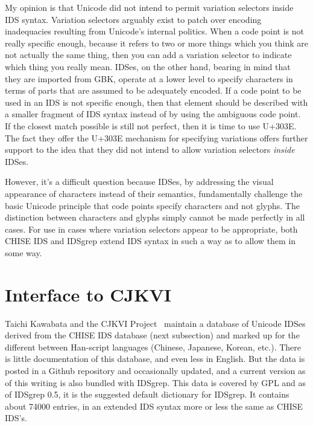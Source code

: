 \documentclass[twocolumn]{report}
\begin{document}
My opinion is that Unicode did not intend to permit variation selectors
inside IDS syntax.  Variation selectors arguably exist to patch over
encoding inadequacies resulting from Unicode's internal politics.  When a
code point is not really specific enough, because it refers to two or more
things which you think are not actually the same thing, then you can add a
variation selector to indicate which thing you really mean.  IDSes, on the
other hand, bearing in mind that they are imported from GBK, operate at a
lower level to specify characters in terms of parts that are assumed to be
adequately encoded.  If a code point to be used in an IDS is not specific
enough, then that element should be described with a smaller fragment of IDS
syntax instead of by using the ambiguous code point.  If the closest match
possible is still not perfect, then it is time to use U+303E.  The fact they
offer the U+303E mechanism for specifying variations offers further support
to the idea that they did not intend to allow variation selectors
\emph{inside} IDSes.

However, it's a difficult question because IDSes, by addressing the visual
appearance of characters instead of their semantics, fundamentally challenge
the basic Unicode principle that code points specify characters and not
glyphs.  The distinction between characters and glyphs simply cannot be made
perfectly in all cases.  For use in cases where variation selectors appear
to be appropriate, both CHISE IDS and IDSgrep extend IDS syntax in
such a way as to allow them in some way.


\section{Interface to CJKVI}

Taichi Kawabata and the CJKVI Project~\cite{CJKVI} maintain a database of
Unicode IDSes derived from the CHISE IDS database (next subsection) and
marked up for the different between Han-script languages (Chinese, Japanese,
Korean, etc.).  There is little documentation of this database, and even
less in English.  But the data is posted in a Github repository and
occasionally updated, and a current version as of this writing is also
bundled with IDSgrep.  This data is
covered by GPL and as of IDSgrep 0.5, it is the suggested default dictionary
for IDSgrep.  It contains about 74000 entries, in an extended IDS syntax
more or less the same as CHISE IDS's.
\end{document}
